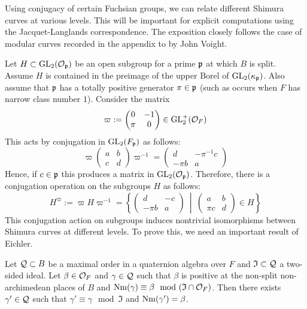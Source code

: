 \documentclass[main.tex]{subfiles}
\begin{document}
Using conjugacy of certain Fuchsian groups, we can relate different Shimura curves at various levels. This will be important for explicit computations using the Jacquet-Langlands correspondence. The exposition closely follows the case of modular curves recorded in the appendix to \cite{zywina:images_of_galois} by John Voight.
\par
Let $H \subset \mathrm{GL}_2(\mathcal{O}_{\mathfrak{p}})$ be an open subgroup for a prime $\mathfrak{p}$ at which $B$ is split. Assume $H$ is contained in the preimage of the upper Borel of $\mathrm{GL}_2(\kappa_{\mathfrak{p}})$. Also assume that $\mathfrak{p}$ has a totally positive generator $\pi \in \mathfrak{p}$ (such as occurs when $F$ has narrow class number $1$). Consider the matrix
\[ \varpi := \begin{pmatrix}
0 & -1
\\
\pi & 0
\end{pmatrix} \in \mathrm{GL}_2^+(\mathcal{O}_F) \]
This acts by conjugation in $\mathrm{GL}_2(F_{\mathfrak{p}})$ as follows:
\[
\varpi
\begin{pmatrix}
a & b
\\
c & d
\end{pmatrix}
\varpi^{-1} =
\begin{pmatrix}
d & - \pi^{-1} c
\\
- \pi b & a
\end{pmatrix}
\]
Hence, if $c \in \mathfrak{p}$ this produces a matrix in $\mathrm{GL}_2(\mathcal{O}_{\mathfrak{p}})$.
Therefore, there is a conjugation operation on the subgroups $H$ as follows:
\[ H^{\varpi} := \varpi H \varpi^{-1} = \left \{
\begin{pmatrix}
d & - c
\\
- \pi b & a
\end{pmatrix} \: \middle| \:
\begin{pmatrix}
a & b
\\
\pi c & d
\end{pmatrix}
\in H
\right \} \]
This conjugation action on subgroups induces nontrivial isomorphisms between Shimura curves at different levels. To prove this, we need an important result of Eichler.

\begin{lemma} \cite[Lemma~2.15]{shimura:curves} \label{lem:eicher_approximation}
Let $\mathcal{Q} \subset B$ be a maximal order in a quaternion algebra over $F$ and $\mathfrak{I} \subset \mathcal{Q}$ a two-sided ideal. Let $\beta \in \mathcal{O}_F$ and $\gamma \in \mathcal{Q}$ such that $\beta$ is positive at the non-split non-archimedean places of $B$ and $\operatorname{\mathrm{Nm}}(\gamma) \equiv \beta \mod (\mathfrak{I} \cap \mathcal{O}_F)$. Then there exists $\gamma' \in \mathcal{Q}$ such that $\gamma' \equiv \gamma \mod \mathfrak{I}$ and $\operatorname{\mathrm{Nm}}(\gamma') = \beta$.
\end{lemma}
\end{document}

